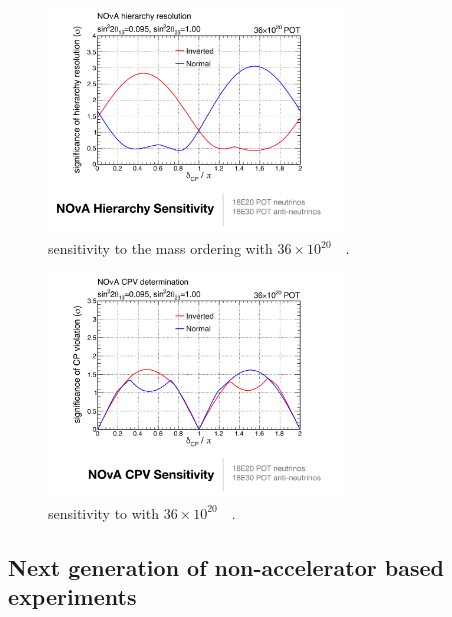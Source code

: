 \begin{figure} [htbp!]
\begin{center}
\includegraphics[width=8cm]{figures/nova_massordering.pdf}
\caption{\label{fig:novasensi} \nova sensitivity to the mass ordering with $36\times10^{20}$~\pot~\cite{messier2016}.}
\end{center}
\end{figure}

\begin{figure} [htbp!]
\begin{center}
\includegraphics[width=8cm]{figures/nova_dcpmessier.pdf}
\caption{\label{fig:novasensidcp} \nova sensitivity to \dcp with $36\times10^{20}$~\pot~\cite{messier2016}.}
\end{center}
\end{figure}







\subsection{Next generation of non-accelerator based experiments}

